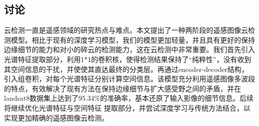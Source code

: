 \documentclass[10pt]{ctexart}
\begin{document}
\begin{multicols}{2}
\section[]{讨论}
云检测一直是遥感领域的研究热点与难点。本文提出了一种两阶段的遥感图像云检测模型。相比于现有的深度学习模型，我们的模型更加轻量，并且具有更好的保持边缘细节的能力和对小的碎云的检测能力，这在云检测中非常重要。我们首先引入光谱特征提取部分，利用1*1的卷积核，使得检测结果保持了“纯粹性”，没有收到其空间信息的干扰，并使使其直达最终的分类层。再通过encoder-decoder结构，引入组卷积，对每个光谱特征分别计算空间信息。该模型充分利用遥感图像多波段的特点，有效解决了现有方法在保持边缘细节与扩大感受野之间的矛盾，并在landsat8数据集上达到了95.34\%的准确率，基本还原了输入影像的细节信息。后续将继续优化光谱特征与空间特征 提取部分，并尝试深度学习与传统方法结合，以实现更加精确的遥感图像云检测。


\end{multicols}
\end{document}
